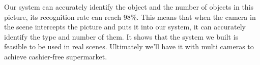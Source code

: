 Our system can accurately identify the object and the number of objects in this picture, its recognition rate can reach 98\%.
This means that when the camera in the scene intercepts the picture and puts it into our system, it can accurately identify the type and number of them.
It shows that the system we built is feasible to be used in real scenes.
Ultimately we'll have it with multi cameras to achieve cashier-free supermarket.


